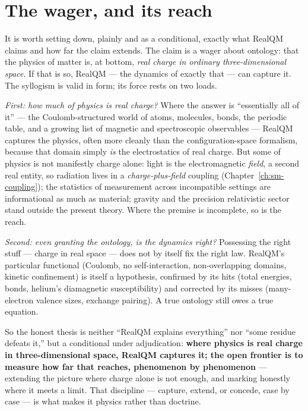 \section{The wager, and its reach}\label{sec:wager}

It is worth setting down, plainly and as a conditional, exactly what RealQM claims and how far the claim extends.
The claim is a wager about ontology: that the physics of matter is, at bottom, \emph{real charge in ordinary
three-dimensional space}. If that is so, RealQM --- the dynamics of exactly that --- can capture it. The
syllogism is valid in form; its force rests on two loads.

\emph{First: how much of physics is real charge?} Where the answer is ``essentially all of it'' --- the
Coulomb-structured world of atoms, molecules, bonds, the periodic table, and a growing list of magnetic and
spectroscopic observables --- RealQM captures the physics, often more cleanly than the configuration-space
formalism, because that domain simply \emph{is} the electrostatics of real charge. But some of physics is not
manifestly charge alone: light is the electromagnetic \emph{field}, a second real entity, so radiation lives in a
\emph{charge-plus-field} coupling (Chapter~\ref{ch:sm-coupling}); the statistics of measurement across
incompatible settings are informational as much as material; gravity and the precision relativistic sector stand
outside the present theory. Where the premise is incomplete, so is the reach.

\emph{Second: even granting the ontology, is the dynamics right?} Possessing the right stuff --- charge in real
space --- does not by itself fix the right law. RealQM's particular functional (Coulomb, no self-interaction,
non-overlapping domains, kinetic confinement) is itself a hypothesis, confirmed by its hits (total energies,
bonds, helium's diamagnetic susceptibility) and corrected by its misses (many-electron valence sizes, exchange
pairing). A true ontology still owes a true equation.

So the honest thesis is neither ``RealQM explains everything'' nor ``some residue defeats it,'' but a conditional
under adjudication: \textbf{where physics is real charge in three-dimensional space, RealQM captures it; the open
frontier is to measure how far that reaches, phenomenon by phenomenon} --- extending the picture where charge
alone is not enough, and marking honestly where it meets a limit. That discipline --- capture, extend, or
concede, case by case --- is what makes it physics rather than doctrine.

